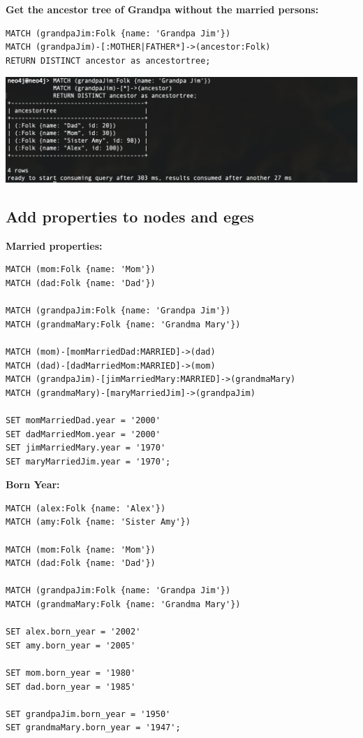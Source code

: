 \documentclass[14pt,a4paper]{extarticle}
\begin{document}
	\noindent \textbf{Get the ancestor tree of Grandpa without the married persons:}
	\begin{lstlisting}[style=sql]
MATCH (grandpaJim:Folk {name: 'Grandpa Jim'})
MATCH (grandpaJim)-[:MOTHER|FATHER*]->(ancestor:Folk)
RETURN DISTINCT ancestor as ancestortree;
	\end{lstlisting}
	\includegraphics[width=\textwidth]{images/sc06.png}

	\pagebreak

	\subsection*{Add properties to nodes and eges}
	\noindent \textbf{Married properties:}
	\begin{lstlisting}[style=sql]
MATCH (mom:Folk {name: 'Mom'})
MATCH (dad:Folk {name: 'Dad'})

MATCH (grandpaJim:Folk {name: 'Grandpa Jim'})
MATCH (grandmaMary:Folk {name: 'Grandma Mary'})

MATCH (mom)-[momMarriedDad:MARRIED]->(dad)
MATCH (dad)-[dadMarriedMom:MARRIED]->(mom)
MATCH (grandpaJim)-[jimMarriedMary:MARRIED]->(grandmaMary)
MATCH (grandmaMary)-[maryMarriedJim]->(grandpaJim)

SET momMarriedDad.year = '2000'
SET dadMarriedMom.year = '2000'
SET jimMarriedMary.year = '1970'
SET maryMarriedJim.year = '1970';
	\end{lstlisting}

	\noindent \textbf{Born Year:}
	\begin{lstlisting}[style=sql]
MATCH (alex:Folk {name: 'Alex'})
MATCH (amy:Folk {name: 'Sister Amy'})

MATCH (mom:Folk {name: 'Mom'})
MATCH (dad:Folk {name: 'Dad'})

MATCH (grandpaJim:Folk {name: 'Grandpa Jim'})
MATCH (grandmaMary:Folk {name: 'Grandma Mary'})

SET alex.born_year = '2002'
SET amy.born_year = '2005'

SET mom.born_year = '1980'
SET dad.born_year = '1985'

SET grandpaJim.born_year = '1950'
SET grandmaMary.born_year = '1947';
	\end{lstlisting}
\end{document}
